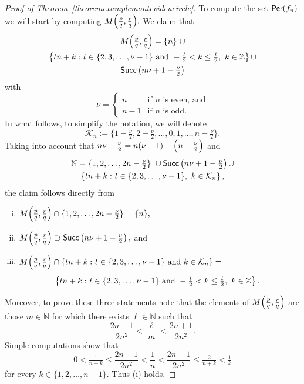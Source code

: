\documentclass[a4paper, 11pt]{amsart}
\numberwithin{equation}{section}
\theoremstyle{customnumberedtheorem}
\theoremstyle{definitionwithbfnote}
\newcommand{\N}{\ensuremath{\mathbb{N}}}
\newcommand{\Z}{\ensuremath{\mathbb{Z}}}
\DeclareMathOperator{\Per}{\textsf{\upshape Per}}
\DeclareMathOperator{\Succ}{\textsf{\upshape Succ}}
\newcommand{\succs}[1]{\ensuremath{\Succ\left(#1\right)}}
\newcommand{\set}[2]{\ensuremath{\left\{#1 \,\colon #2\right\}}}
\begin{document}
\begin{proof}[Proof of Theorem~\ref{theoremexamplemontevideucircle}]
To compute the set $\Per(f_{n})$ we will start by computing
$M\Bigl(\tfrac{p}{q}, \tfrac{r}{q}\Bigr).$
We claim that
\begin{multline*}
 M\Bigl(\tfrac{p}{q}, \tfrac{r}{q}\Bigr) =
   \{n\}\ \cup\\
   \set{t n + k}{t \in \{2,3,\dots,\nu-1\} \text{ and }
                    -\tfrac{t}{2} < k \le \tfrac{t}{2},\ k \in \Z} \cup \\
   \succs{n\nu+1-\tfrac{\nu}{2}}
\end{multline*}
with
\[
\nu = \begin{cases}
        n & \text{if $n$ is even, and}\\
        n-1 & \text{if $n$ is odd.}
     \end{cases}
\]
In what follows, to simplify the notation, we will denote
\[
 \mathcal{K}_n := \{1-\tfrac{\nu}{2}, 2-\tfrac{\nu}{2},\dots,0,1,\dots,n-\tfrac{\nu}{2}\}.
\]
Taking into account that $n\nu - \tfrac{\nu}{2} = n(\nu-1) + \Bigl(n-\tfrac{\nu}{2}\Bigr)$ and
\begin{multline*}
 \N = \{1,2,\dots,2n-\tfrac{\nu}{2}\}\ \cup \succs{n\nu+1-\tfrac{\nu}{2}} \cup \\
      \set{tn+k}{t \in \{2,3,\dots,\nu-1\},\ k \in \mathcal{K}_n},
\end{multline*}
the claim follows directly from
\begin{enumerate}[(i)]
 \item $M\Bigl(\tfrac{p}{q}, \tfrac{r}{q}\Bigr) \cap \{1,2,\dots,2n-\tfrac{\nu}{2}\} = \{n\},$
 \item $M\Bigl(\tfrac{p}{q}, \tfrac{r}{q}\Bigr) \supset \succs{n\nu+1-\tfrac{\nu}{2}},$ and
 \item $\begin{multlined}[t][0.85\textwidth]
             M\Bigl(\tfrac{p}{q}, \tfrac{r}{q}\Bigr) \cap \set{tn+k}{t \in \{2,3,\dots,\nu-1\}\text{ and } k \in \mathcal{K}_n} = \\[1ex]
             \set{t n + k}{t \in \{2,3,\dots,\nu-1\} \text{ and } -\tfrac{t}{2} < k \le \tfrac{t}{2},\ k \in \Z}. \end{multlined}$
\end{enumerate}
Moreover, to prove these three statements note that the elements of
$M\Bigl(\tfrac{p}{q}, \tfrac{r}{q}\Bigr)$ are those $m \in \N$
for which there exists $\ell \in \N$ such that
\begin{equation}\label{Mcdconditionexamplemontevideucircle}
  \frac{2n-1}{2n^{2}} < \frac{\ell}{m} < \frac{2n+1}{2n^{2}}.
\end{equation}
Simple computations show that
\[
 0 < \tfrac{1}{n+k} \le \frac{2n-1}{2n^{2}} < \frac{1}{n} <
     \frac{2n+1}{2n^{2}} \le \tfrac{2}{n+k} < \tfrac{1}{k}
\]
for every $k \in \{1,2,\dots,n-1\}.$
Thus (i) holds.


\end{proof}
\end{document}
